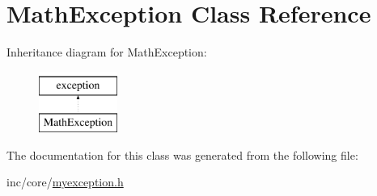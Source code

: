 \hypertarget{classMathException}{\section{Math\-Exception Class Reference}
\label{classMathException}
}
Inheritance diagram for Math\-Exception\-:\begin{figure}[H]
\begin{center}
\leavevmode
\includegraphics[height=2.000000cm]{classMathException}
\end{center}
\end{figure}


The documentation for this class was generated from the following file\-:\begin{DoxyCompactItemize}
\item 
inc/core/\hyperlink{myexception_8h}{myexception.\-h}\end{DoxyCompactItemize}
